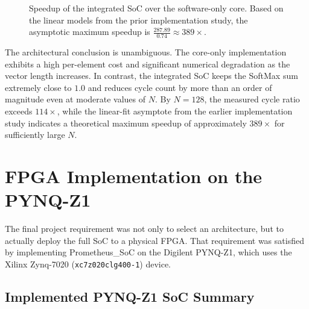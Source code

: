 \documentclass[11pt]{article}
\begin{document}
\begin{figure}[ht]
\centering
{}
\caption{Speedup of the integrated SoC over the software-only core. Based on the linear models from the prior implementation study, the asymptotic maximum speedup is $\frac{287.89}{0.74} \approx 389\times$.}
\label{fig:speedup_compare}
\end{figure}

The architectural conclusion is unambiguous. The core-only implementation exhibits a high per-element cost and significant numerical degradation as the vector length increases. In contrast, the integrated SoC keeps the SoftMax sum extremely close to $1.0$ and reduces cycle count by more than an order of magnitude even at moderate values of $N$. By $N=128$, the measured cycle ratio exceeds $114\times$, while the linear-fit asymptote from the earlier implementation study indicates a theoretical maximum speedup of approximately $389\times$ for sufficiently large $N$.

\section{FPGA Implementation on the PYNQ-Z1}

The final project requirement was not only to select an architecture, but to actually deploy the full SoC to a physical FPGA. That requirement was satisfied by implementing Prometheus\_SoC on the Digilent PYNQ-Z1, which uses the Xilinx Zynq-7020 (\texttt{xc7z020clg400-1}) device.

\subsection{Implemented PYNQ-Z1 SoC Summary}
\end{document}
